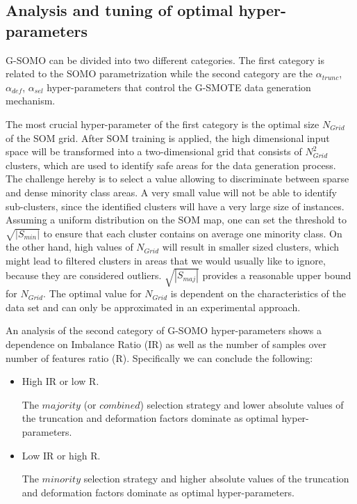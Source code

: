 \documentclass[parskip=full]{scrartcl}
\begin{document}
\subsection{Analysis and tuning of optimal hyper-parameters}

G-SOMO can be divided into two different categories. The first category is
related to the SOMO parametrization while the second category are the
$\alpha_{trunc}$, $\alpha_{def}$, $\alpha_{sel}$ hyper-parameters that control
the G-SMOTE data generation mechanism.

The most crucial hyper-parameter of the first category is the optimal size
$N_{Grid}$ of the SOM grid. After SOM training is applied, the high dimensional
input space will be transformed into a two-dimensional grid that consists of
$N_{Grid}^2$ clusters, which are used to identify safe areas for the data
generation process. The challenge hereby is to select a value allowing to
discriminate between sparse and dense minority class areas.  A very small value
will not be able to identify sub-clusters, since the identified clusters will
have a very large size of instances. Assuming a uniform distribution on the SOM
map, one can set the threshold to $\sqrt{|S_{min}|}$ to ensure that each cluster
contains on average one minority class. On the other hand, high values of
$N_{Grid}$ will result in smaller sized clusters, which might lead to filtered
clusters in areas that we would usually like to ignore, because they are
considered outliers. $\sqrt{|S_{maj}|}$ provides a reasonable upper bound for
$N_{Grid}$. The optimal value for $N_{Grid}$ is dependent on the characteristics
of the data set and can only be approximated in an experimental approach.

An analysis of the second category of G-SOMO hyper-parameters shows a dependence
on Imbalance Ratio (IR) as well as the number of samples over number of features
ratio (R). Specifically we can conclude the following: 

\begin{itemize}
	
	\renewcommand\labelitemi{--}

	\item High IR or low R.
	
	The \( majority \) (or \( combined \)) selection strategy and lower absolute
	values of the truncation and deformation factors dominate as optimal
	hyper-parameters.

	\item Low IR or high R. 
	
	The \( minority \) selection strategy and higher absolute values of the
	truncation and deformation factors dominate as optimal hyper-parameters.

\end{itemize}
\end{document}
